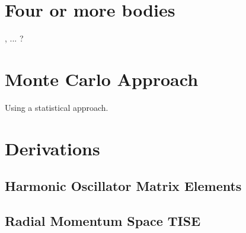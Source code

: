 \documentclass[12pt,a4paper]{report}
\begin{document}
\chapter{Four or more bodies}
\label{cha:four_or_more_bodies}

,  ... ?

\chapter{Monte Carlo Approach}
\label{cha:monte_carlo}

Using a statistical approach.

\appendix

\chapter{Derivations}

\section{Harmonic Oscillator Matrix Elements}
\label{sec:HO matrix elements}



\section{Radial Momentum Space TISE}
\label{sec:radial_mom_space_TISE}




{}
\end{document}
